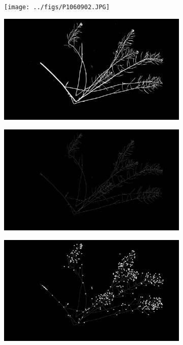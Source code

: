 \documentclass[12pt,]{article}
\begin{document}
\begin{figure}
    \centering
    \begin{subfigure}[t]{0.8\textwidth}
        \centering
        \texttt{[image: ../figs/P1060902.JPG]}
        \caption{} \label{fig:raw}
    \end{subfigure}
    \begin{subfigure}[t]{0.45\textwidth}
        \centering
        \includegraphics[width=\linewidth]{../figs/P1060902.JPG_proc.jpeg}
        \caption{} \label{fig:segmented}
    \end{subfigure}
    \begin{subfigure}[t]{0.45\textwidth}
        \centering
        \includegraphics[width=\linewidth]{../figs/P1060902.JPG_proc_sk.jpeg}
        \caption{} \label{fig:sk}
    \end{subfigure}
        \begin{subfigure}[t]{0.45\textwidth}
        \centering
        \includegraphics[width=\linewidth]{../figs/P1060902.JPG_proc_ends.jpeg}

\end{subfigure}
\end{figure}
\end{document}
